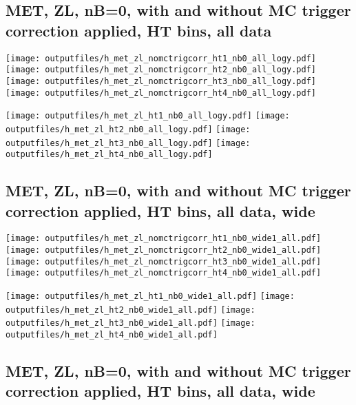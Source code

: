 \documentclass[11pt]{article}
\begin{document}
    \clearpage
     \subsection{ MET, ZL, nB=0, with and without MC trigger correction applied, HT bins, all data}

    \noindent
     \texttt{[image: outputfiles/h\_met\_zl\_nomctrigcorr\_ht1\_nb0\_all\_logy.pdf]}
     \texttt{[image: outputfiles/h\_met\_zl\_nomctrigcorr\_ht2\_nb0\_all\_logy.pdf]}
     \texttt{[image: outputfiles/h\_met\_zl\_nomctrigcorr\_ht3\_nb0\_all\_logy.pdf]}
     \texttt{[image: outputfiles/h\_met\_zl\_nomctrigcorr\_ht4\_nb0\_all\_logy.pdf]}


    \noindent
     \texttt{[image: outputfiles/h\_met\_zl\_ht1\_nb0\_all\_logy.pdf]}
     \texttt{[image: outputfiles/h\_met\_zl\_ht2\_nb0\_all\_logy.pdf]}
     \texttt{[image: outputfiles/h\_met\_zl\_ht3\_nb0\_all\_logy.pdf]}
     \texttt{[image: outputfiles/h\_met\_zl\_ht4\_nb0\_all\_logy.pdf]}


   \clearpage
     \subsection{ MET, ZL, nB=0, with and without MC trigger correction applied, HT bins, all data, wide}

    \noindent
     \texttt{[image: outputfiles/h\_met\_zl\_nomctrigcorr\_ht1\_nb0\_wide1\_all.pdf]}
     \texttt{[image: outputfiles/h\_met\_zl\_nomctrigcorr\_ht2\_nb0\_wide1\_all.pdf]}
     \texttt{[image: outputfiles/h\_met\_zl\_nomctrigcorr\_ht3\_nb0\_wide1\_all.pdf]}
     \texttt{[image: outputfiles/h\_met\_zl\_nomctrigcorr\_ht4\_nb0\_wide1\_all.pdf]}

    \noindent
     \texttt{[image: outputfiles/h\_met\_zl\_ht1\_nb0\_wide1\_all.pdf]}
     \texttt{[image: outputfiles/h\_met\_zl\_ht2\_nb0\_wide1\_all.pdf]}
     \texttt{[image: outputfiles/h\_met\_zl\_ht3\_nb0\_wide1\_all.pdf]}
     \texttt{[image: outputfiles/h\_met\_zl\_ht4\_nb0\_wide1\_all.pdf]}

    \clearpage
     \subsection{ MET, ZL, nB=0, with and without MC trigger correction applied, HT bins, all data, wide}
\end{document}
